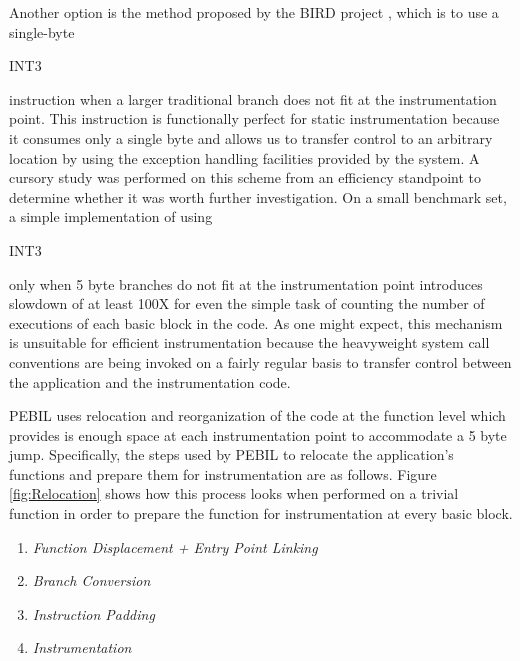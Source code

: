 Another option is the method proposed by the BIRD project \cite{nanda2006bird},
which is to use a single-byte \begin{it}INT3\end{it} instruction when a larger
traditional branch does not fit at the instrumentation point. This instruction
is functionally perfect for static instrumentation because it consumes only a
single byte and allows us to transfer control to an arbitrary location by using
the exception handling facilities provided by the system. A cursory study was
performed on this scheme from an efficiency standpoint to determine whether it
was worth further investigation. On a small benchmark set, a simple
implementation of using \begin{it}INT3\end{it} only when 5 byte branches do not
fit at the instrumentation point introduces slowdown of at least 100X for even
the simple task of counting the number of executions of each basic block in the
code. As one might expect, this mechanism is unsuitable for efficient
instrumentation because the heavyweight system call conventions are being
invoked on a fairly regular basis to transfer control between the application
and the instrumentation code.

PEBIL uses relocation and reorganization of the code at the function level which
provides is enough space at each instrumentation point to accommodate a 5 byte
jump. Specifically, the steps used by PEBIL to relocate the application's
functions and prepare them for instrumentation are as follows. Figure
\ref{fig:Relocation} shows how this process looks when performed on a trivial
function in order to prepare the function for instrumentation at every basic
block.

\begin{enumerate}
 \item \textit{Function Displacement + Entry Point Linking}
 \item \textit{Branch Conversion}
 \item \textit{Instruction Padding}
 \item \textit{Instrumentation}
\end{enumerate}


